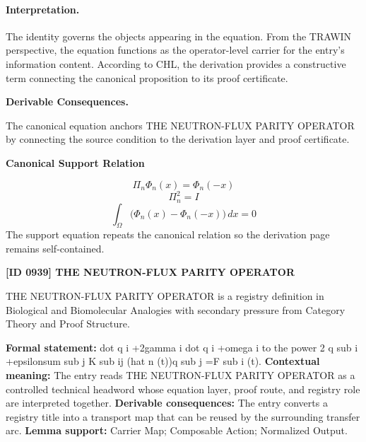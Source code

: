 \paragraph{Interpretation.}
The identity governs the objects appearing in the equation. From the TRAWIN perspective, the equation functions as the operator-level carrier for the entry’s information content. According to CHL, the derivation provides a constructive term connecting the canonical proposition to its proof certificate.

\par\vspace{0.35em}
\noindent\textbf{Derivable Consequences.}\quad
\begingroup
\footnotesize
\raggedright
The canonical equation anchors THE NEUTRON-FLUX PARITY OPERATOR by connecting the source condition to the derivation layer and proof certificate.
\par\endgroup

\noindent\textbf{Canonical Support Relation}\par
\[
\Pi_n\Phi_n(x)=\Phi_n(-x)
\]
\[
\Pi_n^2=I
\]
\[
\int_{\Omega}\bigl(\Phi_n(x)-\Phi_n(-x)\bigr)\,dx=0
\]
\noindent The support equation repeats the canonical relation so the derivation page remains self-contained.\par

\clearpage
\noindent\textbf{[ID 0939] THE NEUTRON-FLUX PARITY OPERATOR}\par
\vspace{0.35em}
\begingroup\small
{}
THE NEUTRON-FLUX PARITY OPERATOR is a registry definition in Biological and Biomolecular Analogies with secondary pressure from Category Theory and Proof Structure.

\begingroup\footnotesize\setlength{\emergencystretch}{3em}\sloppy
\textbf{Formal statement:} dot q i +2gamma i dot q i +omega i to the power 2 q sub i +epsilonsum sub j K sub ij (hat n (t))q sub j =F sub i (t). \textbf{Contextual meaning:} The entry reads THE NEUTRON-FLUX PARITY OPERATOR as a controlled technical headword whose equation layer, proof route, and registry role are interpreted together. \textbf{Derivable consequences:} The entry converts a registry title into a transport map that can be reused by the surrounding transfer arc. \textbf{Lemma support:} Carrier Map; Composable Action; Normalized Output.\par
\endgroup

